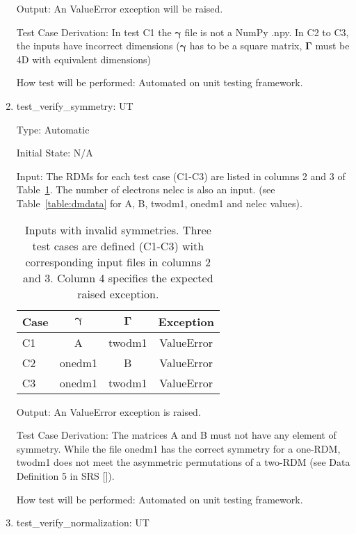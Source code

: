 \documentclass[12pt, titlepage]{article}
\newcounter{utnum} %
\begin{document}
\begin{enumerate}
	Output: An ValueError exception will be raised.
	
	Test Case Derivation: In test C1 the $\boldsymbol{\gamma}$ file is not a 
	NumPy .npy. In C2 to C3, the inputs have incorrect dimensions 
	($\boldsymbol{\gamma}$ has to be a square matrix, $\boldsymbol{\Gamma}$ 
	must be 4D with 
	equivalent dimensions)
	
	How test will be performed: Automated on unit testing framework.
	
	\item{test\_verify\_symmetry:  UT\theutnum 
		\label{UT8}\\}
	
	Type: Automatic
	
	Initial State: N/A
	
	Input: The RDMs for each test case (C1-C3) are listed in 
	columns 2 and 3 of Table~\ref{table:symmdms}. The number of electrons nelec 
	is also an input. (see Table~\ref{table:dmdata} for A, B, twodm1, onedm1 
	and nelec values).
	\begin{table}[h!]
		\centering
		\begin{tabular}{lccc}
			Case & $\boldsymbol{\gamma}$ & $\boldsymbol{\Gamma}$ & Exception  
			\\ \toprule
			C1   &      A       &   twodm1    & ValueError \\
			C2   &   onedm1    &      B       & ValueError \\
			C3   &   onedm1    &   twodm1    & ValueError \\ \bottomrule
		\end{tabular}
		\caption{Inputs with invalid symmetries. Three test cases are defined 
		(C1-C3) with corresponding input files in columns 2 and 3. Column 4 
			specifies the expected raised exception.}
		\label{table:symmdms}
	\end{table}
	
	Output: An ValueError exception is raised.
	
	Test Case Derivation: The matrices A and B must not have any element of 
	symmetry. While the file onedm1 has the correct symmetry for a 
	one-RDM, twodm1 does not meet the asymmetric permutations of 
	a two-RDM (see Data Definition 5 in SRS 
	[\cite{SRS2020}]).
	
	How test will be performed: Automated on unit testing framework.
	
	\item{test\_verify\_normalization:  UT\theutnum 
		\label{UT9}\\}
	

\end{enumerate}
\end{document}
